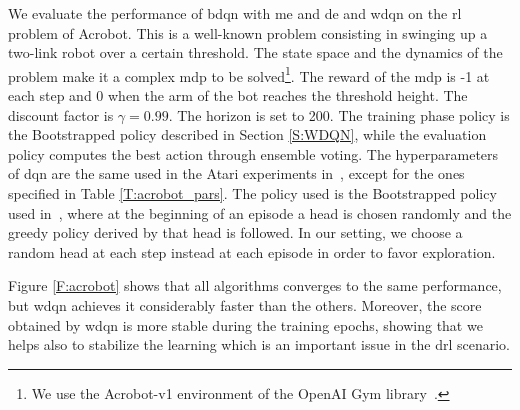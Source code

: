 We evaluate the performance of \gls{bdqn} with \gls{me} and \gls{de} and \gls{wdqn} on the \gls{rl} problem of Acrobot. This is a well-known problem consisting in swinging up a two-link robot over a certain threshold. The state space and the dynamics of the problem make it a complex \gls{mdp} to be solved\footnote{We use the Acrobot-v1 environment of the OpenAI Gym library~\cite{gym}.}. The reward of the \gls{mdp} is -1 at each step and 0 when the arm of the bot reaches the threshold height. The discount factor is $\gamma = 0.99$. The horizon is set to 200. The training phase policy is the Bootstrapped policy described in Section \ref{S:WDQN}, while the evaluation policy computes the best action through ensemble voting. The hyperparameters of \gls{dqn} are the same used in the Atari experiments in~\cite{osband2017deep}, except for the ones specified in Table \ref{T:acrobot_pars}. The policy used is the Bootstrapped policy used in~\cite{osband2017deep}, where at the beginning of an episode a head is chosen randomly and the greedy policy derived by that head is followed. In our setting, we choose a random head at each step instead at each episode in order to favor exploration.

Figure \ref{F:acrobot} shows that all algorithms converges to the same performance, but \gls{wdqn} achieves it considerably faster than the others. Moreover, the score obtained by \gls{wdqn} is more stable during the training epochs, showing that \gls{we} helps also to stabilize the learning which is an important issue in the \gls{drl} scenario.
